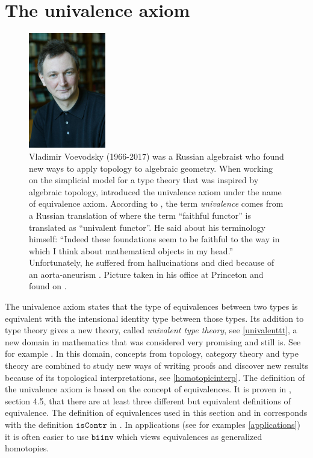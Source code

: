 \documentclass[12pt,a4paper,twoside,xetex]{book} %
\newcommand{\keyword}[1]{\emph{#1}\index{#1}}
\newcommand{\op}[1]{\mathtt{#1}}
\begin{document}
\section{The univalence axiom}

\begin{figure}
\begin{center}
\includegraphics[width=0.3\textwidth]{figures/Voevodsky}
\par\end{center}
\caption{\label{fig:Vladimir-Voevodsky-1966-2017}
  Vladimir Voevodsky (1966-2017)  was a Russian
algebraist who found new ways to apply topology to algebraic geometry. When 
working on the simplicial model for a type theory that was inspired by 
algebraic topology, \cite{Voevodsky2010a} introduced the univalence axiom under 
the name of equivalence axiom. According to \cite{Voevodsky2014}, the term \keyword{univalence} comes from a 
Russian translation of \cite{Boardman2006} where  the term
\textquotedblleft faithful functor\textquotedblright{} is translated
as \textquotedblleft univalent functor\textquotedblright . He said about his terminology himself: ``Indeed these foundations seem 
to be faithful to the way in which I think about mathematical objects in my 
head.''
 Unfortunately, he suffered from hallucinations \cite{Baez2017} and died 
because of an aorta-aneurism \cite{Rehmeyer2017}. Picture taken in his office at Princeton and found on \cite{Grayson2017}.}
\end{figure}

The univalence axiom states that the type of equivalences between two types is 
equivalent with the intensional identity type between those types. Its addition 
to type theory gives a new theory, called \keyword{univalent type theory}, see 
\cref{univalenttt}, a new domain in mathematics that was considered very 
promising and still is. See for example \cite{shulman_2018}. In this domain, concepts from topology, category theory 
and type theory  are combined to study new ways of writing proofs and discover 
new results because of its topological interpretations, see 
\cref{homotopicinterp}. The definition of the univalence axiom is based on the 
concept of equivalences. It is proven in \cite{Voevodsky2013}, section 4.5, 
that there are at least three different but equivalent definitions of 
equivalence. The definition of equivalences used in this section and in 
\cite{Pelayo2014} corresponds with the definition $\op{isContr}$ in 
\cite{Voevodsky2013}. In applications (see for examples \cref{applications}) it 
is often easier to use $\op{biinv}$ which views equivalences as
generalized homotopies.
\end{document}
